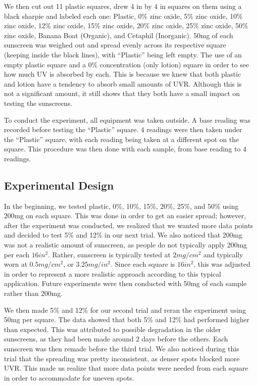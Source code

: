 \documentclass{article}
\begin{document}
We then cut out 11 plastic squares, drew 4 in by 4 in squares on them using a black sharpie and labeled each one: Plastic, 0\% zinc oxide, 5\% zinc oxide, 10\% zinc oxide, 12\% zinc oxide, 15\% zinc oxide, 20\% zinc oxide, 25\% zinc oxide, 50\% zinc oxide, Banana Boat (Organic), and Cetaphil (Inorganic). 50mg of each sunscreen was weighed out and spread evenly across its respective square (keeping inside the black lines), with “Plastic” being left empty. The use of an empty plastic square and a 0\% concentration (only lotion) square in order to see how much UV is absorbed by each. This is because we knew that both plastic and lotion have a tendency to absorb small amounts of UVR. Although this is not a significant amount, it still shows that they both have a small impact on testing the sunscreens.

To conduct the experiment, all equipment was taken outside. A base reading was recorded before testing the “Plastic” square. 4 readings were then taken under the “Plastic” square, with each reading being taken at a different spot on the square. This procedure was then done with each sample, from base reading to 4 readings. 

\subsection{Experimental Design}
In the beginning, we tested plastic, 0\%, 10\%, 15\%, 20\%, 25\%, and 50\% using 200mg on each square. This was done in order to get an easier spread; however, after the experiment was conducted, we realized that we wanted more data points and decided to test 5\% and 12\% in our next trial. We also noticed that 200mg was not a realistic amount of sunscreen, as people do not typically apply 200mg per each $16 in^2$. Rather, sunscreen is typically tested at $2 mg/cm^2$ \cite{fung_spfs_nodate} and typically worn at $0.5 mg/cm^2$, or $3.25 mg/in^2$. Since each square is $16in^2$, this was adjusted in order to represent a more realistic approach according to this typical application. \cite{taylor_simple_2002} Future experiments were then conducted with 50mg of each sample rather than 200mg.

We then made 5\% and 12\% for our second trial and reran the experiment using 50mg per square. The data showed that both 5\% and 12\% had performed higher than expected. This was attributed to possible degradation in the older sunscreens, as they had been made around 2 days before the others. Each sunscreen was then remade before the third trial. We also noticed during this trial that the spreading was pretty inconsistent, as denser spots blocked more UVR. This made us realize that more data points were needed from each square in order to accommodate for uneven spots.
\end{document}
